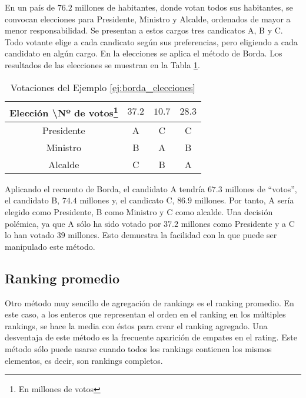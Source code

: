 \begin{ejemplo}\label{ej:borda_elecciones} 

En un país de $76.2$ millones de habitantes, donde votan todos sus habitantes, se convocan elecciones para Presidente, Ministro y Alcalde, ordenados de mayor a menor responsabilidad. Se presentan a estos cargos tres candicatos A, B y C. Todo votante elige a cada candicato según sus preferencias, pero eligiendo a cada candidato en algún cargo. En la elecciones se aplica el método de Borda. Los resultados de las elecciones se muestran en la Tabla \ref{tbl:borda_elecciones}.\\
 
\begin{savenotes}
\begin{table}[h]
\centering
\caption{Votaciones del Ejemplo \ref{ej:borda_elecciones}}
\label{tbl:borda_elecciones}
\begin{tabular}{@{}cccc@{}}
\toprule
Elección \textbackslash Nº de votos\footnote{En millones de votos} & $37.2$ & $10.7$ & $28.3$ \\ \midrule
Presidente           & A    & C    & C    \\
Ministro             & B    & A    & B    \\
Alcalde              & C    & B    & A    \\ \bottomrule
\end{tabular}
\end{table}
\end{savenotes}

Aplicando el recuento de Borda, el candidato A tendría $67.3$ millones de ``votos'', el candidato B, $74.4$ millones y, el candicato C, $86.9$ millones. Por tanto, A sería elegido como Presidente, B como Ministro y C como alcalde. Una decisión polémica, ya que A sólo ha sido votado por $37.2$ millones como Presidente y a C lo han votado $39$ millones. Esto demuestra la facilidad con la que puede ser manipulado este método.  

\end{ejemplo}

\subsection{Ranking promedio}
Otro método muy sencillo de agregación de rankings es el ranking promedio. En este caso, a los enteros que representan el orden en el ranking en los múltiples rankings, se hace la media con éstos para crear el ranking agregado. Una desventaja de este método es la frecuente aparición de empates en el rating. Este método sólo puede usarse cuando todos los rankings contienen los mismos elementos, es decir, son rankings completos. 

